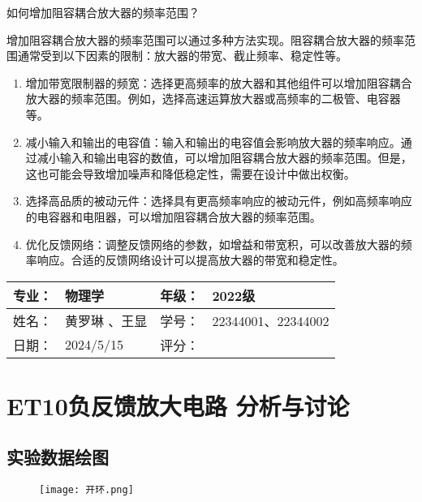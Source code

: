 \documentclass[dvipsnames, svgnames,a4paper,11pt]{article}
\begin{document}
	\begin{question}
		如何增加阻容耦合放大器的频率范围？
	\end{question}
	增加阻容耦合放大器的频率范围可以通过多种方法实现。阻容耦合放大器的频率范围通常受到以下因素的限制：放大器的带宽、截止频率、稳定性等。
	\begin{enumerate}
	
	
	

	\item 增加带宽限制器的频宽：选择更高频率的放大器和其他组件可以增加阻容耦合放大器的频率范围。例如，选择高速运算放大器或高频率的二极管、电容器等。

	\item 减小输入和输出的电容值：输入和输出的电容值会影响放大器的频率响应。通过减小输入和输出电容的数值，可以增加阻容耦合放大器的频率范围。但是，这也可能会导致增加噪声和降低稳定性，需要在设计中做出权衡。

	\item 选择高品质的被动元件：选择具有更高频率响应的被动元件，例如高频率响应的电容器和电阻器，可以增加阻容耦合放大器的频率范围。

	\item 优化反馈网络：调整反馈网络的参数，如增益和带宽积，可以改善放大器的频率响应。合适的反馈网络设计可以提高放大器的带宽和稳定性。
	
\end{enumerate}

	
	
	\clearpage
	\begin{table}
		\renewcommand\arraystretch{1.7}
		\begin{tabularx}{\textwidth}{|X|X|X|X|}
			\hline
			专业：& 物理学 &年级：& 2022级\\
			\hline
			姓名： &黄罗琳 、王显 & 学号：&22344001、22344002 \\
			\hline
			日期：& 2024/5/15  & 评分： &\\
			\hline
		\end{tabularx}
	\end{table}
	\section{ET10负反馈放大电路 \quad\heiti 分析与讨论}
	
	\subsection{实验数据绘图}
	\begin{figure}[{H}]
		\centering
		\texttt{[image: 开环.png]}
		
		\label{}
	\end{figure}
	
\end{document}
